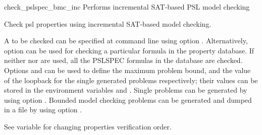 \begin{nusmvCommand}{check\_pslspec\_bmc\_inc} {Performs incremental SAT-based PSL model checking}


Check psl properties using incremental SAT-based model checking.

A \pslexpr to be checked can be specified at command line using option
. Alternatively, option  can be used for checking a
particular formula in the property database. If neither  nor
 are used, all the PSLSPEC formulas in the database are
checked. Options  and  can be used to define the
maximum problem bound, and the value of the loopback for the single generated
problems respectively; their values can be stored in the environment variables
 and . Single problems can be
generated by using option . Bounded model checking problems can
be generated and dumped in a file by using option .

See variable  for changing properties
verification order.

\begin{cmdOpt}






\end{cmdOpt}
\end{nusmvCommand}
